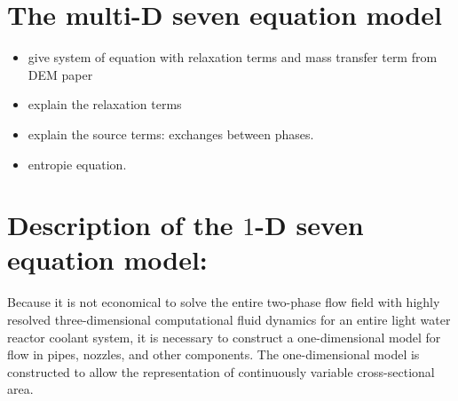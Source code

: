 \section{The multi-D seven equation model}\label{sec:multi-seven-equ-model}
\begin{itemize}
\item give system of equation with relaxation terms and mass transfer term from DEM paper
\item explain the relaxation terms
\item explain the source terms: exchanges between phases.
\item entropie equation.
\end{itemize}
\section{Description of the $1$-D seven equation model:}
Because it is not economical to solve the entire two-phase flow field
with highly resolved three-dimensional computational fluid dynamics for an
entire light water reactor coolant system,
it is necessary to construct a one-dimensional model for flow in
pipes, nozzles, and other components.  The one-dimensional model is
constructed to allow the representation of continuously variable
cross-sectional area.

